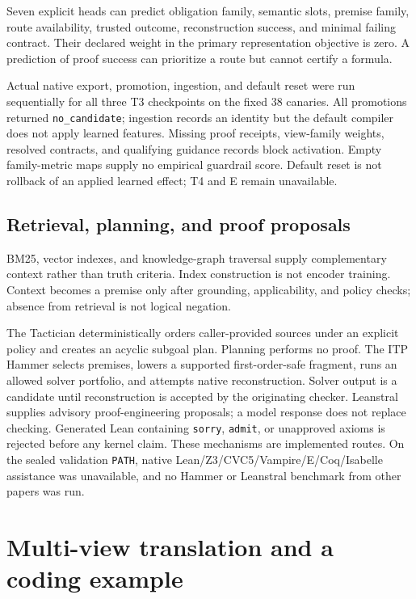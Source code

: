 \documentclass{article}
\begin{document}
Seven explicit heads can predict obligation family, semantic slots, premise family, route availability, trusted outcome, reconstruction success, and minimal failing contract. Their declared weight in the primary representation objective is zero. A prediction of proof success can prioritize a route but cannot certify a formula.

Actual native export, promotion, ingestion, and default reset were run sequentially for all three T3 checkpoints on the fixed 38 canaries. All promotions returned \texttt{no\_candidate}; ingestion records an identity but the default compiler does not apply learned features. Missing proof receipts, view-family weights, resolved contracts, and qualifying guidance records block activation. Empty family-metric maps supply no empirical guardrail score. Default reset is not rollback of an applied learned effect; T4 and E remain unavailable.

\subsection{Retrieval, planning, and proof proposals}
BM25, vector indexes, and knowledge-graph traversal supply complementary context rather than truth criteria. Index construction is not encoder training. Context becomes a premise only after grounding, applicability, and policy checks; absence from retrieval is not logical negation.

The Tactician deterministically orders caller-provided sources under an explicit policy and creates an acyclic subgoal plan. Planning performs no proof. The ITP Hammer selects premises, lowers a supported first-order-safe fragment, runs an allowed solver portfolio, and attempts native reconstruction. Solver output is a candidate until reconstruction is accepted by the originating checker. Leanstral supplies advisory proof-engineering proposals; a model response does not replace checking. Generated Lean containing \texttt{sorry}, \texttt{admit}, or unapproved axioms is rejected before any kernel claim. These mechanisms are implemented routes. On the sealed validation \texttt{PATH}, native Lean/Z3/CVC5/Vampire/E/Coq/Isabelle assistance was unavailable, and no Hammer or Leanstral benchmark from other papers was run.

\section{Multi-view translation and a coding example}
\end{document}
